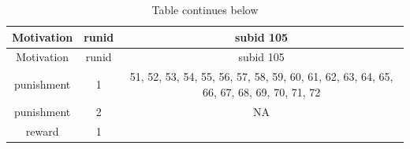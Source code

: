\documentclass[]{article}
\begin{document}
\begin{longtable}[]{@{}ccc@{}}
\caption{Table continues below}\tabularnewline
\toprule
\begin{minipage}[b]{0.16\columnwidth}\centering\strut
Motivation\strut
\end{minipage} & \begin{minipage}[b]{0.10\columnwidth}\centering\strut
runid\strut
\end{minipage} & \begin{minipage}[b]{0.41\columnwidth}\centering\strut
subid 105\strut
\end{minipage}\tabularnewline
\midrule
\endfirsthead
\toprule
\begin{minipage}[b]{0.16\columnwidth}\centering\strut
Motivation\strut
\end{minipage} & \begin{minipage}[b]{0.10\columnwidth}\centering\strut
runid\strut
\end{minipage} & \begin{minipage}[b]{0.41\columnwidth}\centering\strut
subid 105\strut
\end{minipage}\tabularnewline
\midrule
\endhead
\begin{minipage}[t]{0.16\columnwidth}\centering\strut
punishment\strut
\end{minipage} & \begin{minipage}[t]{0.10\columnwidth}\centering\strut
1\strut
\end{minipage} & \begin{minipage}[t]{0.41\columnwidth}\centering\strut
51, 52, 53, 54, 55, 56, 57, 58, 59, 60, 61, 62, 63, 64, 65, 66, 67, 68,
69, 70, 71, 72\strut
\end{minipage}\tabularnewline
\begin{minipage}[t]{0.16\columnwidth}\centering\strut
punishment\strut
\end{minipage} & \begin{minipage}[t]{0.10\columnwidth}\centering\strut
2\strut
\end{minipage} & \begin{minipage}[t]{0.41\columnwidth}\centering\strut
NA\strut
\end{minipage}\tabularnewline
\begin{minipage}[t]{0.16\columnwidth}\centering\strut
reward\strut
\end{minipage} & \begin{minipage}[t]{0.10\columnwidth}\centering\strut
1\strut
\end{minipage} & \begin{minipage}[t]{0.41\columnwidth}\centering\strut

\end{minipage}
\end{longtable}
\end{document}

